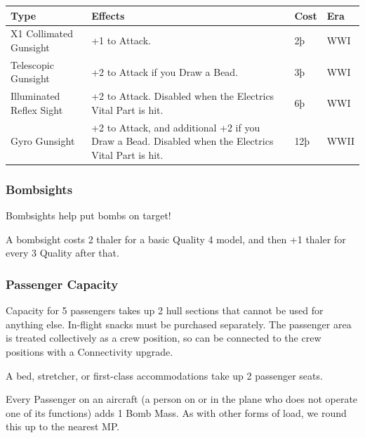 \documentclass{article}
\begin{document}
\begin{tabular}{|l|l|l|l|}
    \hline
    Type                                                  & Effects                                        & Cost & Era \\\hline
    X1 Collimated Gunsight                                & +1 to Attack.                                  & 2þ   & WWI \\\hline
    Telescopic Gunsight                                   & +2 to Attack if you Draw a Bead.               & 3þ   & WWI \\\hline
    Illuminated Reflex Sight                              & +2 to Attack. Disabled when the Electrics
    Vital Part is hit.                                    & 6þ                                             & WWI        \\\hline
    Gyro Gunsight                                         & {+2 to Attack, and additional +2 if you Draw a
    Bead. Disabled when the Electrics Vital Part is hit.} & {12þ}                                          &
    {WWII}                                                                                                              \\\hline
\end{tabular}

\subsubsection{Bombsights}
\label{_Bombsights}

Bombsights help put bombs on target!

A bombsight costs 2 thaler for a basic Quality 4 model, and then
+1 thaler for every 3 Quality after that.

\subsubsection{Passenger Capacity}
\label{_Passenger_Capacity}

Capacity for 5 passengers takes up 2 hull sections that cannot be used
for anything else. In-flight snacks must be purchased separately. The
passenger area is treated collectively as a crew position, so can be
connected to the crew positions with a Connectivity upgrade.

A bed, stretcher, or first-class accommodations take up 2
passenger seats.

Every Passenger on an aircraft (a person on or in the plane who
does not operate one of its functions) adds 1 Bomb Mass. As with other
forms of load, we round this up to the nearest MP.
\end{document}
